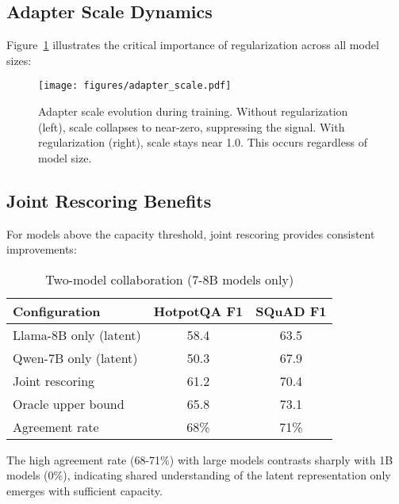 \documentclass{article}
\begin{document}
\subsection{Adapter Scale Dynamics}

Figure~\ref{fig:scale} illustrates the critical importance of regularization across all model sizes:

\begin{figure}[h]
\vskip 0.2in
\begin{center}
\centerline{\texttt{[image: figures/adapter\_scale.pdf]}}
\caption{Adapter scale evolution during training. Without regularization (left), scale collapses to near-zero, suppressing the signal. With regularization (right), scale stays near 1.0. This occurs regardless of model size.}
\label{fig:scale}
\end{center}
\vskip -0.2in
\end{figure}

\subsection{Joint Rescoring Benefits}

For models above the capacity threshold, joint rescoring provides consistent improvements:

\begin{table}[h]
\caption{Two-model collaboration (7-8B models only)}
\label{tab:joint_large}
\vskip 0.15in
\begin{center}
\begin{small}
\begin{tabular}{lcc}
\toprule
Configuration & HotpotQA F1 & SQuAD F1 \\
\midrule
Llama-8B only (latent) & 58.4 & 63.5 \\
Qwen-7B only (latent) & 50.3 & 67.9 \\
Joint rescoring & 61.2 & 70.4 \\
Oracle upper bound & 65.8 & 73.1 \\
Agreement rate & 68\% & 71\% \\
\bottomrule
\end{tabular}
\end{small}
\end{center}
\vskip -0.1in
\end{table}

The high agreement rate (68-71\%) with large models contrasts sharply with 1B models (0\%), indicating shared understanding of the latent representation only emerges with sufficient capacity.
\end{document}
